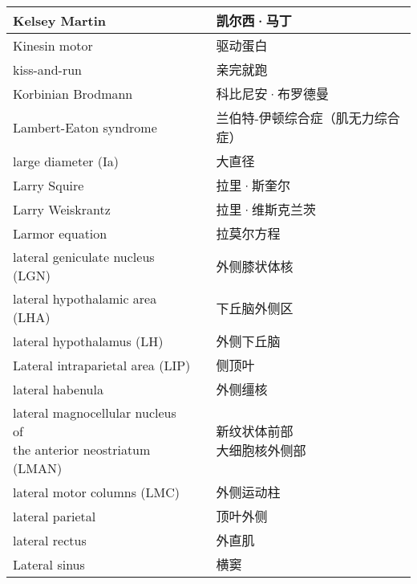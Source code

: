 \begin{longtable}{lll}
	\midrule
	Kelsey Martin   && 凯尔西·马丁  \\
	
	\midrule
	Kinesin motor   && 驱动蛋白  \\
	
	\midrule
	kiss-and-run   && 亲完就跑  \\
	
	\midrule
	Korbinian Brodmann   && 科比尼安·布罗德曼  \\
	
	\midrule
	Lambert-Eaton syndrome   && 兰伯特-伊顿综合症（肌无力综合症）  \\
	
	\midrule
	large diameter (Ia)     &&  大直径  \\
	
	\midrule
	Larry Squire   && 拉里·斯奎尔  \\
	
	\midrule
	Larry Weiskrantz   && 拉里·维斯克兰茨  \\
	
	\midrule
	Larmor equation   && 拉莫尔方程  \\
	
	\midrule
	lateral geniculate nucleus (LGN)   && 外侧膝状体核  \\
	
	\midrule
	lateral hypothalamic area (LHA)  && 下丘脑外侧区  \\
	
	\midrule
	lateral hypothalamus (LH)  && 外侧下丘脑  \\
	
	\midrule
	Lateral intraparietal area (LIP)   && 侧顶叶  \\
	
	\midrule
	lateral habenula   && 外侧缰核  \\
	
	\midrule
	\makecell{lateral magnocellular nucleus of \\ the anterior neostriatum (LMAN)}  && \makecell{新纹状体前部\\大细胞核外侧部}  \\
	
	\midrule
	lateral motor columns (LMC)   && 外侧运动柱  \\
	
	\midrule
	lateral parietal   && 顶叶外侧  \\
	
	\midrule
	lateral rectus   && 外直肌  \\
	
	\midrule
	Lateral sinus   && 横窦  \\
	

\end{longtable}
